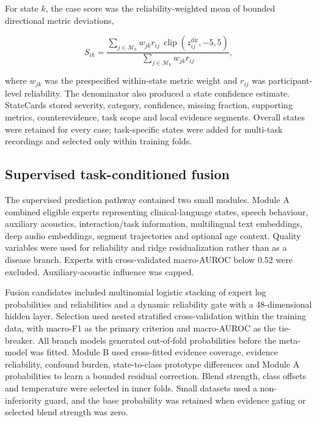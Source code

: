 \documentclass[pdflatex,sn-nature]{sn-jnl}
\begin{document}
For state $k$, the case score was the reliability-weighted mean of bounded directional metric deviations,

\begin{equation}
S_{ik}=\frac{\sum_{j\in\mathcal{M}_k} w_{jk}r_{ij}\,\operatorname{clip}(z_{ij}^{\mathrm{dir}},-5,5)}{\sum_{j\in\mathcal{M}_k} w_{jk}r_{ij}},
\end{equation}

where $w_{jk}$ was the prespecified within-state metric weight and $r_{ij}$ was participant-level reliability. The denominator also produced a state confidence estimate. StateCards stored severity, category, confidence, missing fraction, supporting metrics, counterevidence, task scope and local evidence segments. Overall states were retained for every case; task-specific states were added for multi-task recordings and selected only within training folds.

\subsection{Supervised task-conditioned fusion}

The supervised prediction pathway contained two small modules. Module A combined eligible experts representing clinical-language states, speech behaviour, auxiliary acoustics, interaction/task information, multilingual text embeddings, deep audio embeddings, segment trajectories and optional age context. Quality variables were used for reliability and ridge residualization rather than as a disease branch. Experts with cross-validated macro-AUROC below 0.52 were excluded. Auxiliary-acoustic influence was capped.

Fusion candidates included multinomial logistic stacking of expert log probabilities and reliabilities and a dynamic reliability gate with a 48-dimensional hidden layer. Selection used nested stratified cross-validation within the training data, with macro-F1 as the primary criterion and macro-AUROC as the tie-breaker. All branch models generated out-of-fold probabilities before the meta-model was fitted. Module B used cross-fitted evidence coverage, evidence reliability, confound burden, state-to-class prototype differences and Module A probabilities to learn a bounded residual correction. Blend strength, class offsets and temperature were selected in inner folds. Small datasets used a non-inferiority guard, and the base probability was retained when evidence gating or selected blend strength was zero.
\end{document}
